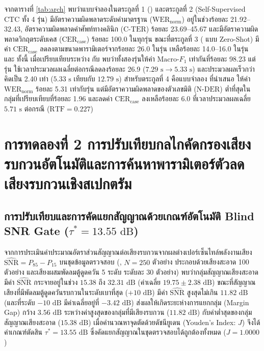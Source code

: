 จากตารางที่ \ref{tab:arch} พบว่าแบบจำลองในตระกูลที่ 1 () และตระกูลที่ 2 (Self-Supervised CTC ทั้ง 4 รุ่น) มีอัตราความผิดพลาดระดับคำมาตรฐาน ($\mathrm{WER}_{\mathrm{norm}}$) อยู่ในช่วงร้อยละ 21.92--32.43, อัตราความผิดพลาดคำศัพท์ทางคลินิก ($\mathrm{C\text{-}TER}$) ร้อยละ 23.69--45.67 และมีอัตราความผิดพลาดวิกฤตระดับเคส ($\mathrm{CER}_{\mathrm{case}}$) ร้อยละ 100.0 ในทุกรุ่น ขณะที่ตระกูลที่ 3 ( แบบ Zero-Shot) มีค่า $\mathrm{CER}_{\mathrm{case}}$ ลดลงตามขนาดพารามิเตอร์จากร้อยละ 26.0 ในรุ่น  เหลือร้อยละ 14.0--16.0 ในรุ่น  และ  ทั้งนี้ เมื่อเปรียบเทียบระหว่าง  กับ  พบว่าทั้งสองรุ่นให้ค่า $\mathrm{Macro\text{-}}F_1$ เท่ากันที่ร้อยละ 98.23 แต่รุ่น  ใช้เวลาประมวลผลเฉลี่ยต่อกรณีลดลงร้อยละ 26.9 ($7.29\text{ s} \rightarrow 5.33\text{ s}$) และประมวลผลเร็วกว่า  คิดเป็น 2.40 เท่า ($5.33\text{ s}$ เทียบกับ $12.79\text{ s}$) สำหรับตระกูลที่ 4 คือแบบจำลอง  ที่นำเสนอ ให้ค่า $\mathrm{WER}_{\mathrm{norm}}$ ร้อยละ 5.31 เท่ากับรุ่น  แต่มีอัตราความผิดพลาดของตัวเลขมิติ ($\mathrm{N\text{-}DER}$) ต่ำที่สุดในกลุ่มที่เปรียบเทียบที่ร้อยละ 1.96 และลดค่า $\mathrm{CER}_{\mathrm{case}}$ ลงเหลือร้อยละ 6.0 ที่เวลาประมวลผลเฉลี่ย $5.71\text{ s}$ ต่อกรณี ($\mathrm{RTF} = 0.227$)

\section{การทดลองที่ 2
การปรับเทียบกลไกคัดกรองเสียงรบกวนอัตโนมัติและการค้นหาพารามิเตอร์ตัวลดเสียงรบกวนเชิงสเปกตรัม}
\label{sec:exp2}

\subsection{การปรับเทียบและการคัดแยกสัญญาณด้วยเกณฑ์อัตโนมัติ Blind SNR Gate ($\tau^* = 13.55\text{ dB}$)}

จากการประเมินค่าประมาณอัตราส่วนสัญญาณต่อเสียงรบกวนจากผลต่างเปอร์เซ็นไทล์พลังงานเสียง $\widehat{\mathrm{SNR}} = P_{85} - P_{15}$ บนชุดข้อมูลตรวจสอบ (, $N=250$ ตัวอย่าง ประกอบด้วยเสียงสะอาด 100 ตัวอย่าง และเสียงผสมพัดลมตู้ดูดควัน 5 ระดับ ระดับละ 30 ตัวอย่าง) พบว่ากลุ่มสัญญาณเสียงสะอาดมีค่า $\widehat{\mathrm{SNR}}$ กระจายอยู่ในช่วง $15.38$ ถึง $32.31\text{ dB}$ (ค่าเฉลี่ย $19.75 \pm 2.38\text{ dB}$) ขณะที่สัญญาณเสียงที่มีพัดลมตู้ดูดควันรบกวนในระดับเบาที่สุด ($+10\text{ dB}$) มีค่า $\widehat{\mathrm{SNR}}$ สูงสุดไม่เกิน $11.82\text{ dB}$ (และที่ระดับ $-10\text{ dB}$ มีค่าเฉลี่ยอยู่ที่ $-3.42\text{ dB}$) ส่งผลให้เกิดระยะห่างการแยกกลุ่ม (Margin Gap) กว้าง $3.56\text{ dB}$ ระหว่างค่าสูงสุดของกลุ่มที่มีเสียงรบกวน ($11.82\text{ dB}$) กับค่าต่ำสุดของกลุ่มสัญญาณเสียงสะอาด ($15.38\text{ dB}$) เมื่อคำนวณหาจุดตัดด้วยดัชนียูเดน (Youden's Index: $J$) \cite{youden1950index} จึงได้ค่าเกณฑ์ตัดสิน $\tau^* = 13.55\text{ dB}$ ซึ่งคัดแยกสัญญาณในชุดตรวจสอบได้ถูกต้องทั้งหมด ($J = 1.0000$)

